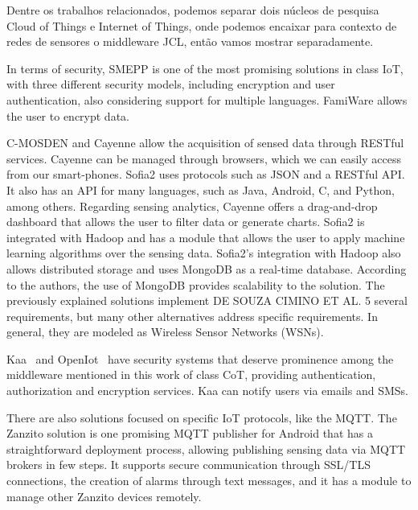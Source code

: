 \documentclass[12pt]{article}
\begin{document}
Dentre os trabalhos relacionados, podemos separar dois núcleos de pesquisa Cloud of Things e Internet of Things, onde podemos encaixar para contexto de redes de sensores o middleware JCL, então vamos mostrar separadamente.


In terms of security, SMEPP\cite{caro2009smepp} is one of the most promising solutions in class IoT, with three different security models, including encryption and user authentication, also considering support for multiple languages. FamiWare allows the user to encrypt data.

C-MOSDEN\cite{c-mosden} and Cayenne allow the acquisition of sensed data through RESTful services. Cayenne can be managed through browsers, which we can easily access from our smart-phones. 
Sofia2 uses protocols such as JSON and a RESTful API. It also has an API for many languages,
such as Java, Android, C, and Python, among others. Regarding sensing analytics, Cayenne offers a drag-and-drop
dashboard that allows the user to filter data or generate charts. Sofia2 is integrated with Hadoop and has a module that
allows the user to apply machine learning algorithms over the sensing data. Sofia2's integration with Hadoop also allows distributed storage and uses MongoDB as a real-time database. According
to the authors, the use of MongoDB provides scalability to the solution. The previously explained solutions implement
DE SOUZA CIMINO ET AL. 5
several requirements, but many other alternatives address specific requirements. In general, they are modeled as Wireless
Sensor Networks (WSNs).\cite{Cimino2018}

Kaa~\cite{Kaa} and OpenIot~\cite{openiot} have security systems that deserve prominence among the middleware mentioned in this work of class CoT, providing authentication, authorization and encryption services. Kaa can notify users via emails and SMSs.

There are also solutions focused on specific IoT protocols, like the MQTT. The Zanzito solution is one promising
MQTT publisher for Android that has a straightforward deployment process, allowing publishing sensing data via MQTT
brokers in few steps. It supports secure communication through SSL/TLS connections, the creation of alarms through
text messages, and it has a module to manage other Zanzito devices remotely.
\end{document}
